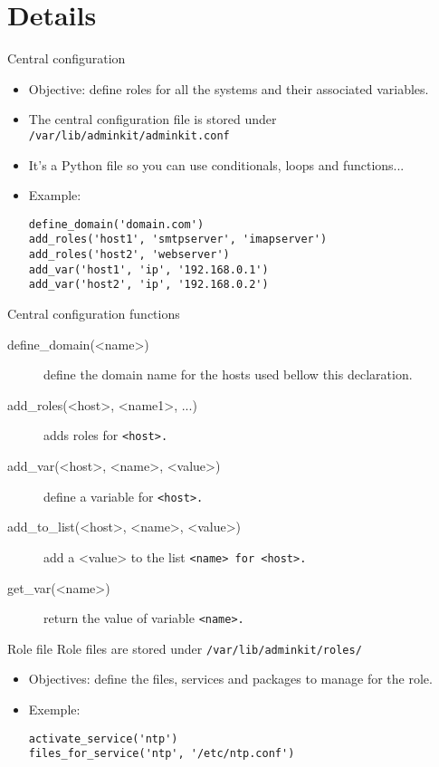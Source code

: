\documentclass[xcolor=dvipsnames]{beamer}
\begin{document}
\section{Details}
\begin{frame}[fragile]{Central configuration}

\begin{itemize}
  \item Objective: define roles for all the systems and their
    associated variables.
  \item The central configuration file is stored under
    \tt{/var/lib/adminkit/adminkit.conf}
  \item It's a Python file so you can use conditionals, loops and functions...
  \item Example:
\lstset{language=Python,frame=single,numbers=left}
\begin{lstlisting}
define_domain('domain.com')
add_roles('host1', 'smtpserver', 'imapserver')
add_roles('host2', 'webserver')
add_var('host1', 'ip', '192.168.0.1')
add_var('host2', 'ip', '192.168.0.2')
\end{lstlisting}

\end{itemize}

\end{frame}

\begin{frame}{Central configuration functions}

\begin{description}
  \item[define\_domain(<name>)] define the domain name for the hosts
    used bellow this declaration.

  \item[add\_roles(<host>, <name1>, ...)] adds roles for \tt{<host>}.

  \item[add\_var(<host>, <name>, <value>)] define a variable for \tt{<host>}.

  \item[add\_to\_list(<host>, <name>, <value>)] add a <value> to the
    list \tt{<name>} for \tt{<host>}.

  \item[get\_var(<name>)] return the value of variable \tt{<name>}.
\end{description}

\end{frame}

\begin{frame}[fragile]{Role file}
  Role files are stored under \tt{/var/lib/adminkit/roles/}
\begin{itemize}
  \item Objectives: define the files, services and packages to manage
    for the role.
  \item Exemple:
\begin{lstlisting}
activate_service('ntp')
files_for_service('ntp', '/etc/ntp.conf')
\end{lstlisting}
\end{itemize}
\end{frame}
\end{document}
